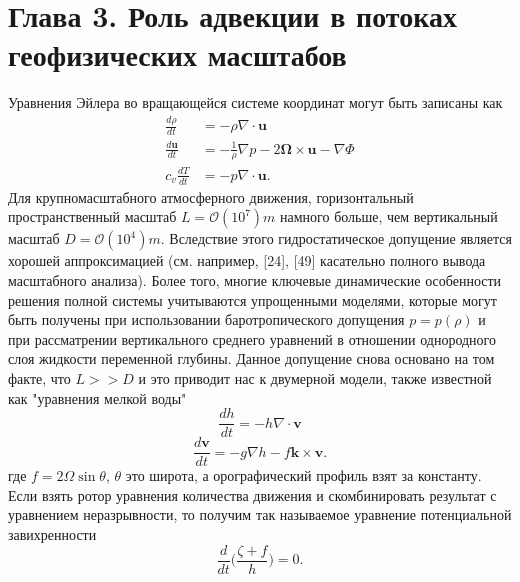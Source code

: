 \chapter*{Глава 3. Роль адвекции в потоках геофизических масштабов} \label{chapt_3}
Уравнения Эйлера во вращающейся системе координат могут быть записаны как
%
\begin{align}
\label{eq:equation3_1}
\frac{d\rho}{dt}&=-\rho\nabla\cdot\mathbf{u}\\
\label{eq:equation3_2}
\frac{d\mathbf{u}}{dt}&=-\frac{1}{\rho}\nabla p - 2 \mathbf{\Omega} \times \mathbf{u} - \nabla \Phi\\
\label{eq:equation3_3}
c_v\frac{dT}{dt}&=-p\nabla\cdot\mathbf{u}.
\end{align}
%
Для крупномасштабного атмосферного движения, горизонтальный пространственный масштаб $L=\mathcal{O}(10^7)m$ намного больше, чем вертикальный масштаб $D=\mathcal{O}(10^4)m$. Вследствие этого гидростатическое допущение является хорошей аппроксимацией (см. например, [24], [49] касательно полного вывода масштабного анализа). Более того, многие ключевые динамические особенности решения полной системы учитываются упрощенными моделями, которые могут быть получены при использовании баротропического допущения $p=p(\rho)$ и при  рассматрении вертикального среднего уравнений в отношении однородного слоя жидкости переменной глубины. Данное допущение снова основано на том факте, что $L >> D$ и это приводит нас к двумерной модели, также известной как "уравнения мелкой воды"
%
\begin{equation}
\label{eq:equation3_4}
\frac{dh}{dt}=-h\nabla \cdot \mathbf{v}
\end{equation}
%
%
\begin{equation}
\label{eq:equation3_5}
\frac{d\mathbf{v}}{dt}=-g\nabla h - f\mathbf{k}\times \mathbf{v}.
\end{equation}
%
где $f=2\Omega\sin\theta$, $\theta$ это широта, а орографический профиль взят за константу. Если взять ротор уравнения количества движения и скомбинировать результат с уравнением неразрывности, то получим так называемое уравнение потенциальной завихренности
%
\begin{equation}
\label{eq:equation3_6}
\frac{d}{dt}\Big(\frac{\zeta + f}{h}\Big) = 0.
\end{equation}
%
